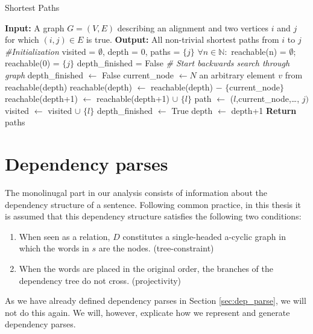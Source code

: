 \documentclass{report}
\begin{document}
\begin{algorithm}[!ht]
\caption{Shortest Paths}\label{alg:shortest paths}
\begin{algorithmic}
\STATE \textbf{Input:} A graph $G = (V,E)$ describing an alignment and two vertices $i$ and $j$ for which $(i,j)\in E$ is true.
\STATE \textbf{Output:} All non-trivial shortest paths from $i$ to $j$
\STATE \textit{\#Initialization}
\STATE visited = $\emptyset$, depth = $0$, paths = $\{j\}$
\STATE $\forall n\in\mathbb{N}:$ reachable(n) = $\emptyset$; reachable($0$) = $\{j\}$
\STATE depth\_finished = False
\STATE \textit{\# Start backwards search through graph}
		\STATE depth\_finished $\leftarrow$ False
		\STATE current\_node $\leftarrow N$ an arbitrary element $v$ from reachable(depth)
		\STATE reachable(depth) $\leftarrow$ reachable(depth) $-$ $\{$current\_node$\}$
				\STATE reachable(depth+1) $\leftarrow$ reachable(depth+1) $\cup$ $\{l\}$
					\STATE path $\leftarrow$ ($l$,current\_node,\ldots, $j)$
				\ENDFOR
			\ENDIF
		\STATE visited $\leftarrow$ visited $\cup$ $\{l\}$
		\ENDFOR
	\STATE depth\_finished $\leftarrow$ True
	\STATE depth $\leftarrow$ depth+1
	\ENDWHILE
\ENDWHILE
\STATE \textbf{Return} paths
\end{algorithmic}
\end{algorithm}


\section{Dependency parses}

The monolinugal part in our analysis consists of information about the dependency structure of a sentence. Following common practice, in this thesis it is assumed that this dependency structure satisfies the following two conditions:\begin{enumerate}
\item When seen as a relation, $D$ constitutes a single-headed a-cyclic graph in which the words in $s$ are the nodes. (tree-constraint)
\item When the words are placed in the original order, the branches of the dependency tree do not cross. (projectivity)
\end{enumerate}

As we have already defined dependency parses in Section \ref{sec:dep_parse}, we will not do this again. We will, however, explicate how we represent and generate dependency parses.
\end{document}
